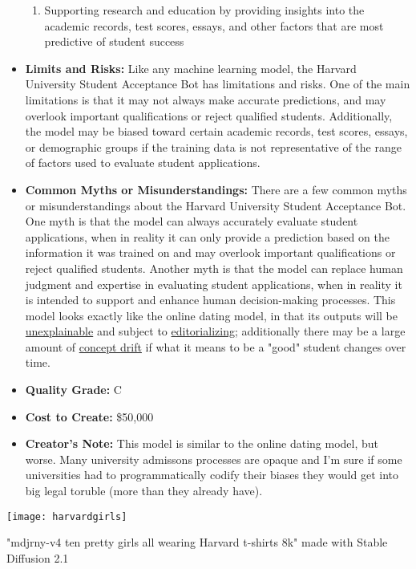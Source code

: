 \begin{itemize}
\begin{enumerate}
            \item Supporting research and education by providing insights into the academic records, test scores, essays, and other factors that are most predictive of student success
        \end{enumerate}
    \item \textbf{Limits and Risks:} Like any machine learning model, the Harvard University Student Acceptance Bot has limitations and risks. One of the main limitations is that it may not always make accurate predictions, and may overlook important qualifications or reject qualified students. Additionally, the model may be biased toward certain academic records, test scores, essays, or demographic groups if the training data is not representative of the range of factors used to evaluate student applications.
    \item \textbf{Common Myths or Misunderstandings:} There are a few common myths or misunderstandings about the Harvard University Student Acceptance Bot. One myth is that the model can always accurately evaluate student applications, when in reality it can only provide a prediction based on the information it was trained on and may overlook important qualifications or reject qualified students. Another myth is that the model can replace human judgment and expertise in evaluating student applications, when in reality it is intended to support and enhance human decision-making processes. This model looks exactly like the online dating model, in that its outputs will be \hyperref[sec:explain]{unexplainable} and subject to \hyperref[sec:janitor]{editorializing}; additionally there may be a large amount of \hyperref[sec:drift]{concept drift} if what it means to be a "good" student changes over time. 
    \item \textbf{Quality Grade:} C
    \item \textbf{Cost to Create:} \$50,000
    \item \textbf{Creator's Note:} This model is similar to the online dating model, but worse. Many university admissons processes are opaque and I'm sure if some universities had to programmatically codify their biases they would get into big legal toruble (more than they already have).
\end{itemize}

\begin{pdf}
\begin{marginfigure}[-5.5cm]
        \texttt{[image: harvardgirls]}
        \caption{"mdjrny-v4 ten pretty girls all wearing Harvard t-shirts 8k" made with Stable Diffusion 2.1}
\end{marginfigure}
\end{pdf}

